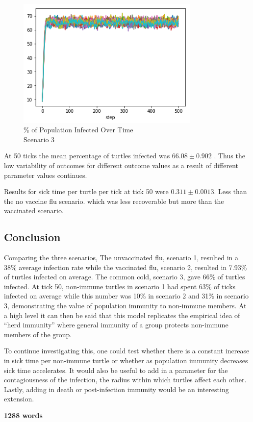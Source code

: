 \documentclass[11pt]{article} %
\begin{document}
\begin{figure}
\centering
\includegraphics[width=0.8\textwidth]{20-runs-scenario-3-steady-state}
\caption{\% of Population Infected Over Time \\ Scenario 3}
\end{figure}


At 50 ticks the mean percentage of turtles infected was $66.08 \pm 0.902$ . Thus the low variability of outcomes for different outcome values as a result of different parameter values continues. 

Results for sick time per turtle per tick at tick 50 were $0.311 \pm 0.0013$. Less than the no vaccine flu scenario. which was less recoverable but more than the vaccinated scenario. 


\subsection{Conclusion}

Comparing the three scenarios, The unvaccinated flu, scenario 1, resulted in a 38\% average infection rate while the vaccinated flu, scenario 2, resulted in 7.93\% of turtles infected on average. The common cold, scenario 3,  gave 66\% of turtles infected. At tick 50, non-immune turtles in scenario 1 had spent 63\% of ticks infected on average while this number was  10\% in scenario 2 and 31\% in scenario 3, demonstrating the value of population immunity to non-immune members.  At a high level it can then be said that this model replicates the empirical idea of ``herd immunity'' where general immunity of a group protects non-immune members of the group. 

To continue investigating this, one could test whether there is a constant increase in sick time per non-immune turtle or whether as population immunity decreases sick time accelerates. It would also be useful to add in a parameter for the contagiousness of the infection, the radius within which turtles affect each other. Lastly, adding in death or post-infection immunity would be an interesting extension. 


\textbf{1288 words}


\nocite{*}


\printbibliography
\end{document}
